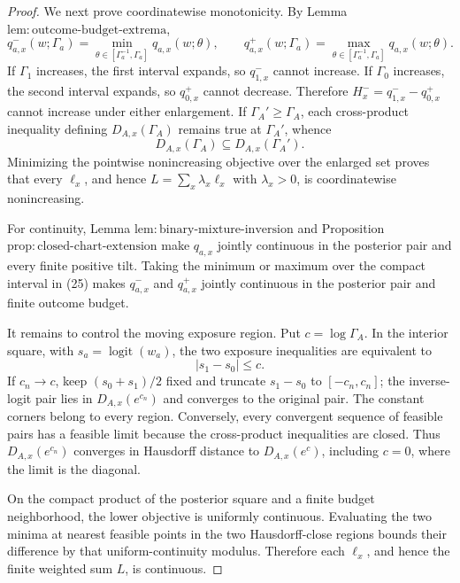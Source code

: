 \documentclass{article}
\begin{document}
\begin{proof}
We next prove coordinatewise monotonicity.  By Lemma \(\mathrm{lem{:}outcome\text{-}budget\text{-}extrema}\),
\[
 q^-_{a,x}(w;\Gamma_a)
 =\min_{\theta\in[\Gamma_a^{-1},\Gamma_a]}q_{a,x}(w;\theta),
 \qquad
 q^+_{a,x}(w;\Gamma_a)
 =\max_{\theta\in[\Gamma_a^{-1},\Gamma_a]}q_{a,x}(w;\theta).           \tag{25}
\]
If \(\Gamma_1\) increases, the first interval expands, so \(q^-_{1,x}\) cannot increase.  If \(\Gamma_0\) increases, the second interval expands, so \(q^+_{0,x}\) cannot decrease.  Therefore \(H_x^-=q^-_{1,x}-q^+_{0,x}\) cannot increase under either enlargement.  If \(\Gamma_A'\geq\Gamma_A\), each cross-product inequality defining \(D_{A,x}(\Gamma_A)\) remains true at \(\Gamma_A'\), whence
\[
 D_{A,x}(\Gamma_A)\subseteq D_{A,x}(\Gamma_A').                        \tag{26}
\]
Minimizing the pointwise nonincreasing objective over the enlarged set proves that every \(\ell_x\), and hence \(L=\sum_x\lambda_x\ell_x\) with \(\lambda_x>0\), is coordinatewise nonincreasing.

For continuity, Lemma \(\mathrm{lem{:}binary\text{-}mixture\text{-}inversion}\) and Proposition \(\mathrm{prop{:}closed\text{-}chart\text{-}extension}\) make \(q_{a,x}\) jointly continuous in the posterior pair and every finite positive tilt.  Taking the minimum or maximum over the compact interval in (25) makes \(q^-_{a,x}\) and \(q^+_{a,x}\) jointly continuous in the posterior pair and finite outcome budget.

It remains to control the moving exposure region.  Put \(c=\log\Gamma_A\).  In the interior square, with \(s_a=\operatorname{logit}(w_a)\), the two exposure inequalities are equivalent to
\[
 |s_1-s_0|\leq c.                                                       \tag{27}
\]
If \(c_n\to c\), keep \((s_0+s_1)/2\) fixed and truncate \(s_1-s_0\) to \([ -c_n,c_n]\); the inverse-logit pair lies in \(D_{A,x}(e^{c_n})\) and converges to the original pair.  The constant corners belong to every region.  Conversely, every convergent sequence of feasible pairs has a feasible limit because the cross-product inequalities are closed.  Thus \(D_{A,x}(e^{c_n})\) converges in Hausdorff distance to \(D_{A,x}(e^c)\), including \(c=0\), where the limit is the diagonal.

On the compact product of the posterior square and a finite budget neighborhood, the lower objective is uniformly continuous.  Evaluating the two minima at nearest feasible points in the two Hausdorff-close regions bounds their difference by that uniform-continuity modulus.  Therefore each \(\ell_x\), and hence the finite weighted sum \(L\), is continuous.


\end{proof}
\end{document}
